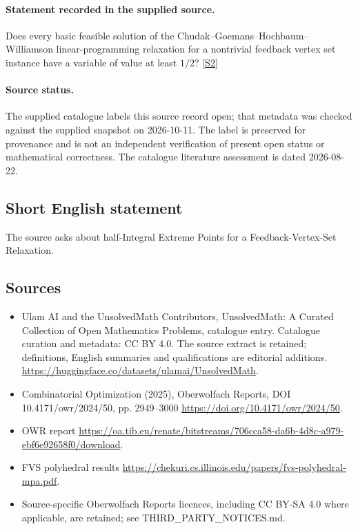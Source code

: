 \documentclass[11pt]{article}
\begin{document}
\paragraph{Statement recorded in the supplied source.}
Does every basic feasible solution of the Chudak–Goemans–Hochbaum–Williamson linear-programming relaxation for a nontrivial feedback vertex set instance have a variable of value at least $1/2$? \href{https://doi.org/10.4171/owr/2024/50}{[S2]}
\paragraph{Source status.}
The supplied catalogue labels this source record open; that metadata was checked against the supplied snapshot on 2026-10-11. The label is preserved for provenance and is not an independent verification of present open status or mathematical correctness. The catalogue literature assessment is dated 2026-08-22.
\subsection{Short English statement}
The source asks about half-Integral Extreme Points for a Feedback-Vertex-Set Relaxation.
\subsection{Sources}
\begin{itemize}
\item[S1] Ulam AI and the UnsolvedMath Contributors, UnsolvedMath: A Curated Collection of Open Mathematics Problems, catalogue entry. Catalogue curation and metadata: CC BY 4.0. The source extract is retained; definitions, English summaries and qualifications are editorial additions.
\url{https://huggingface.co/datasets/ulamai/UnsolvedMath}.
\item[S2] Combinatorial Optimization (2025), Oberwolfach Reports, DOI 10.4171/owr/2024/50, pp. 2949--3000
\url{https://doi.org/10.4171/owr/2024/50}.
\item[S3] OWR report
\url{https://oa.tib.eu/renate/bitstreams/706cca58-da6b-4d8c-a979-ebf6e92658f0/download}.
\item[S4] FVS polyhedral results
\url{https://chekuri.cs.illinois.edu/papers/fvs-polyhedral-mpa.pdf}.
\item Source-specific Oberwolfach Reports licences, including CC BY-SA 4.0 where applicable, are retained; see THIRD\_PARTY\_NOTICES.md.
\end{itemize}
\end{document}
